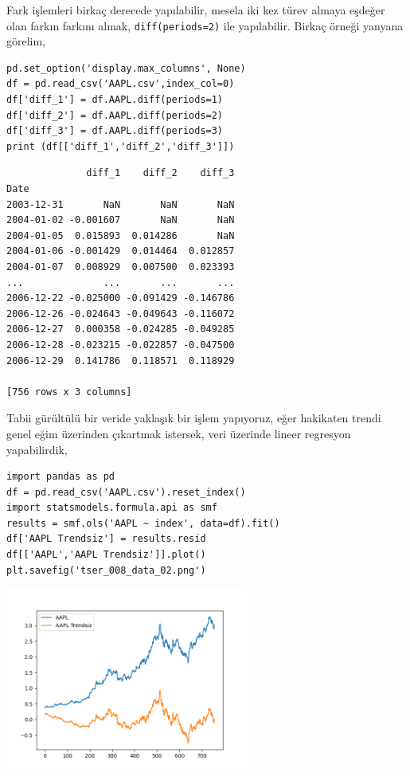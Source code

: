 \documentclass[12pt,fleqn]{article}\usepackage{../../common}
\begin{document}
Fark işlemleri birkaç derecede yapılabilir, mesela iki kez türev almaya
eşdeğer olan farkın farkını almak, \verb!diff(periods=2)! ile yapılabilir.
Birkaç örneği yanyana görelim,

\begin{verbatim}
pd.set_option('display.max_columns', None)
df = pd.read_csv('AAPL.csv',index_col=0)
df['diff_1'] = df.AAPL.diff(periods=1)
df['diff_2'] = df.AAPL.diff(periods=2)
df['diff_3'] = df.AAPL.diff(periods=3)
print (df[['diff_1','diff_2','diff_3']])
\end{verbatim}

\begin{verbatim}
              diff_1    diff_2    diff_3
Date                                    
2003-12-31       NaN       NaN       NaN
2004-01-02 -0.001607       NaN       NaN
2004-01-05  0.015893  0.014286       NaN
2004-01-06 -0.001429  0.014464  0.012857
2004-01-07  0.008929  0.007500  0.023393
...              ...       ...       ...
2006-12-22 -0.025000 -0.091429 -0.146786
2006-12-26 -0.024643 -0.049643 -0.116072
2006-12-27  0.000358 -0.024285 -0.049285
2006-12-28 -0.023215 -0.022857 -0.047500
2006-12-29  0.141786  0.118571  0.118929

[756 rows x 3 columns]
\end{verbatim}

Tabii gürültülü bir veride yaklaşık bir işlem yapıyoruz, eğer hakikaten trendi
genel eğim üzerinden çıkartmak istersek, veri üzerinde lineer regresyon
yapabilirdik,

\begin{verbatim}
import pandas as pd
df = pd.read_csv('AAPL.csv').reset_index()
import statsmodels.formula.api as smf
results = smf.ols('AAPL ~ index', data=df).fit()
df['AAPL Trendsiz'] = results.resid
df[['AAPL','AAPL Trendsiz']].plot()
plt.savefig('tser_008_data_02.png')
\end{verbatim}

\includegraphics[height=6cm]{tser_008_data_02.png}
\end{document}
